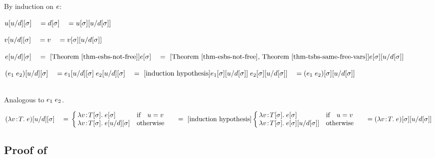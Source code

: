 By induction on $e$:

\begin{bycase}

\Case{$\varI$}
\begin{links}
$u[u/d][\sigma]
 \\\hspace*{1em}=\\
 d[\sigma]
 \\\hspace*{1em}=\\
 u[\sigma][u/d[\sigma]]$
\end{links}

\Case{$\var\neq\varI$}
\begin{links}
$v[u/d][\sigma]
 \\\hspace*{1em}=\\
 v
 \\\hspace*{1em}=\\
 v[\sigma][u/d[\sigma]]$
\end{links}

\Case{$\opO$, $\descopO$, $\pjop{\fnam}$}
\begin{links}
$\tsbsO{\esbsO{\expr}}
 \link{=}{\thmref{thm-esbs-not-free}}
 \tsbsO{\expr}
 \link{=}{\thmref{thm-esbs-not-free}, \thmref{thm-tsbs-same-free-vars}}
 \esbs{\tsbsO{\expr}}{\varI}{\tsbsO{\exprI}}$
\end{links}

\Case{$\appO$}
\begin{links}
$(e_1\;e_2)[u/d][\sigma]
 \\\hspace*{1em}=\\
 e_1[u/d][\sigma]\;e_2[u/d][\sigma]
 \\\hspace*{1em}=\ [\mbox{induction hypothesis}]\\
 e_1[\sigma][u/d[\sigma]]\;e_2[\sigma][u/d[\sigma]]
 \\\hspace*{1em}=\\
 (e_1\;e_2)[\sigma][u/d[\sigma]]$
\end{links}

\Case{$\eqO$, $\iifO$}\\
Analogous to $\appO$.

\Case{$\absO$}
\begin{links}
$\tsbsO{\esbsO{(\absO)}}
 \linK{=}
 \cond{\varI=\var}
      {\abs{\var}{\tsbsO{\typ}}{\tsbsO{\expr}}}
      {\abs{\var}{\tsbsO{\typ}}{\tsbsO{\esbsO{\expr}}}}
 \link{=}{\indhyp}
 \cond{\varI=\var}
      {\abs{\var}{\tsbsO{\typ}}{\tsbsO{\expr}}}
      {\abs{\var}{\tsbsO{\typ}}{\esbs{\tsbsO{\expr}}{\varI}{\tsbsO{\exprI}}}}
 \linK{=}
 \esbs{\tsbsO{(\absO)}}{\varI}{\tsbsO{\exprI}}$
\end{links}

\end{bycase}



\subsection*{Proof of }

